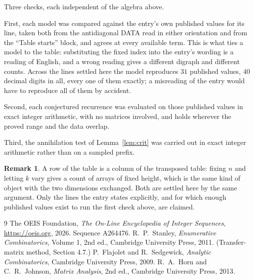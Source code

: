 \documentclass[11pt,a4paper]{article}
\theoremstyle{plain}
\theoremstyle{definition}
\newtheorem{remark}[theorem]{Remark}
\begin{document}
Three checks, each independent of the algebra above.

First, each model was compared against the entry's own published values for its line, taken
both from the antidiagonal DATA read in either orientation and from the ``Table starts''
block, and agrees at every available term. This is what ties a model to the table:
substituting the fixed index into the entry's wording is a reading of English, and a wrong
reading gives a different digraph and different counts. Across the lines settled here the
model reproduces $31$ published values, $40$ decimal digits in all, every one of
them exactly; a misreading of the entry would have to reproduce all of them by accident.

Second, each conjectured recurrence was evaluated on those published values in exact
integer arithmetic, with no matrices involved, and holds wherever the proved range and the
data overlap.

Third, the annihilation test of Lemma~\ref{lem:crit} was carried out in exact integer
arithmetic rather than on a sampled prefix.

\begin{remark}
A row of the table is a column of the transposed table: fixing $n$ and letting $k$ vary gives a
count of arrays of fixed height, which is the same kind of object with the two dimensions
exchanged. Both are settled here by the same argument. Only the lines the entry states
explicitly, and for which enough published values exist to run the first check above, are
claimed.
\end{remark}

\begin{thebibliography}{9}
 The OEIS Foundation, \emph{The On-Line Encyclopedia of Integer
Sequences}, \url{https://oeis.org}, 2026. Sequence A264476.
 R.~P.~Stanley, \emph{Enumerative Combinatorics}, Volume 1, 2nd ed.,
Cambridge University Press, 2011. (Transfer-matrix method, Section 4.7.)
 P.~Flajolet and R.~Sedgewick, \emph{Analytic Combinatorics}, Cambridge
University Press, 2009.
 R.~A.~Horn and C.~R.~Johnson, \emph{Matrix Analysis}, 2nd ed., Cambridge
University Press, 2013.
\end{thebibliography}
\end{document}

